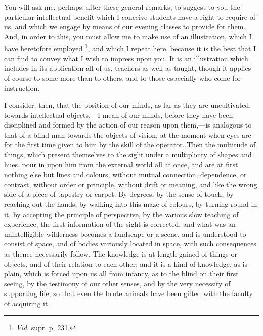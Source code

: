 You will ask me, perhaps, after these general remarks, to suggest
to you the particular intellectual benefit which I conceive students
have a right to require of us, and which we engage by means of our
evening classes to provide for them. And, in order to this, you must
allow me to make use of an illustration, which I have heretofore
employed \footnote{\emph{Vid}.
supr. p. 231.}, and which I
repeat here, because it is the best that I can find to convey what I
wish to impress upon you. It is an illustration which includes in its
application all of us, teachers as well as taught, though it applies
of course to some more than to others, and to those especially who
come for instruction.

I consider, then, that the position of our minds, as far as they
are uncultivated, towards intellectual objects,—I mean of our minds,
before they have been disciplined and formed by the action of our
reason upon them,—is analogous to that of a blind man towards the
objects of vision, at the moment when eyes are for the first time
given to him by the skill of the operator. Then the multitude of
things, which present themselves to the sight under a multiplicity of
shapes and hues, pour in upon him from the external world all at once,
and are at first nothing else but lines and colours, without mutual
connection, dependence, or contrast, without order or principle,
without drift or meaning, and like the wrong side of a piece of
tapestry or carpet. By degrees, by the sense of touch, by reaching out
the hands, by walking into this maze of colours, by turning round in
it, by accepting the principle of perspective, by the various slow
teaching of experience, the first information of the sight is
corrected, and what was an unintelligible wilderness becomes a
landscape or a scene, and is understood to consist of space, and of
bodies variously located in space, with such consequences as thence
necessarily follow. The knowledge is at length gained of things or
objects, and of their relation to each other; and it is a kind of
knowledge, as is plain, which is forced upon us all from infancy, as
to the blind on their first seeing, by the testimony of our other
senses, and by the very necessity of supporting life; so that even the
brute animals have been gifted with the faculty of acquiring it.

